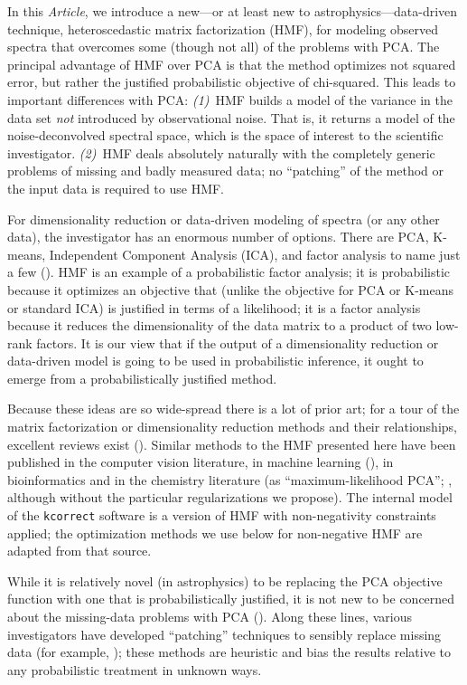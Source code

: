 \documentclass[12pt,preprint]{aastex}
\newcommand{\documentname}{\textsl{Article}}
\begin{document}
In this \documentname, we introduce a new---or at least new to
astrophysics---data-driven technique, heteroscedastic matrix
factorization (HMF), for modeling observed spectra that overcomes some
(though not all) of the problems with PCA.  The principal advantage of
HMF over PCA is that the method optimizes not squared error, but
rather the justified probabilistic objective of chi-squared.  This
leads to important differences with PCA: \textsl{(1)}~HMF builds a
model of the variance in the data set \emph{not} introduced by
observational noise.  That is, it returns a model of the
noise-deconvolved spectral space, which is the space of interest to
the scientific investigator.  \textsl{(2)}~HMF deals absolutely
naturally with the completely generic problems of missing and badly
measured data; no ``patching'' of the method or the input data is
required to use HMF.

For dimensionality reduction or data-driven modeling of spectra (or
any other data), the investigator has an enormous number of options.
There are PCA, K-means, Independent Component Analysis (ICA), 
and factor analysis to name just a few (\citealt{rz}).
HMF is an example of a probabilistic factor analysis;
it is probabilistic because it optimizes an objective that
(unlike the objective for PCA or K-means or standard ICA) is
justified in terms of a likelihood; it is a factor analysis because it
reduces the dimensionality of the data matrix to a product of two
low-rank factors.  It is our view that if the output of a
dimensionality reduction or data-driven model is going to be used in
probabilistic inference, it ought to emerge from a probabilistically
justified method.

Because these ideas are so wide-spread there is a lot of prior art;
for a tour of the matrix factorization or dimensionality reduction
methods and their relationships, excellent reviews exist
(\citealt{rz}).
Similar methods to the HMF presented here have been
published in the computer vision literature, in machine 
learning (\citealt{wilsona, wilsonb}), in bioinformatics \citep{bio} and in
the chemistry literature (as ``maximum-likelihood PCA'';
\citealt{mlpca}, although without the particular regularizations we
propose).  The internal model of the \texttt{kcorrect} software
\citep{blanton} is a version of HMF with non-negativity constraints
applied; the optimization methods we use below for non-negative HMF
are adapted from that source.

While it is relatively novel (in astrophysics) to be replacing the PCA
objective function with one that is probabilistically justified, it is
not new to be concerned about the missing-data problems with PCA (\citealt{connollya, budavarirobust}).
Along these lines, various investigators have developed ``patching''
techniques to sensibly replace missing data (for example,
\citealt{eishogg, wild, budavarirobust, borosona}); these methods are
heuristic and bias the results relative to any probabilistic treatment
in unknown ways.
\end{document}
